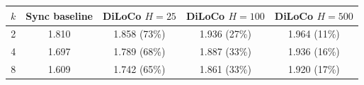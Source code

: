 \begin{tabular}{ccccc}
\toprule
$k$ & Sync baseline & DiLoCo $H{=}25$ & DiLoCo $H{=}100$ & DiLoCo $H{=}500$ \\
\midrule
2 & 1.810 & 1.858 (73\%) & 1.936 (27\%) & 1.964 (11\%) \\
4 & 1.697 & 1.789 (68\%) & 1.887 (33\%) & 1.936 (16\%) \\
8 & 1.609 & 1.742 (65\%) & 1.861 (33\%) & 1.920 (17\%) \\
\bottomrule
\end{tabular}
